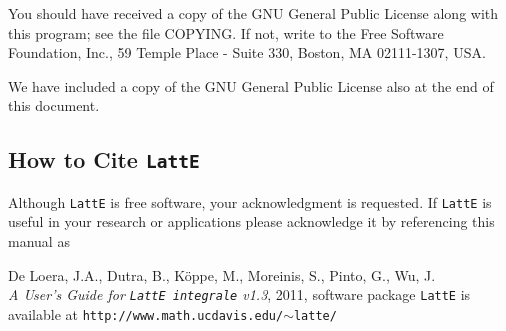 \documentclass{article}
\newcommand{\latte}{{\tt LattE}\xspace}
\newcommand{\latteV}{v1.3}
\begin{document}
You should have received a copy of the GNU General Public License
along with this program; see the file COPYING. If not, write to
the Free Software Foundation, Inc., 59 Temple Place - Suite 330,
Boston, MA 02111-1307, USA.

We have included a copy of the GNU General Public License also at the
end of this document.

\subsection{How to Cite {\tt LattE}}

Although {\tt LattE} is free software, your acknowledgment
is requested.  If {\tt LattE} is useful in your research or
applications please acknowledge it by referencing this manual as

De Loera, J.A., Dutra, B., K\"oppe, M., Moreinis, S.,
Pinto, G., Wu, J.\\ 
{\em A User's Guide for {\tt LattE integrale} \latteV}, 2011, 
software package \latte is available at 
{\tt http://www.math.ucdavis.edu/$\sim$latte/}
	
\end{document}
